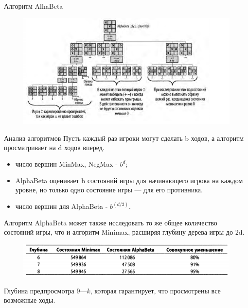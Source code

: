 \documentclass{beamer}
\begin{document}
\begin{frame}{Алгоритм AlhaBeta}
\begin{figure}[h]
\centering
\includegraphics[scale=0.6]{images/lec05-pic11.png}
\end{figure}
\end{frame}

\begin{frame}{Анализ алгоритмов}
Пусть каждый раз игроки могут сделать b ходов, а алгоритм просматривает на d ходов вперед. 
\begin{itemize}
\item число вершин MinMax, NegMax - $b^d$;
\item AlphaBeta оценивает b состояний игры для начинающего игрока на каждом уровне, но только одно состояние игры — для его противника. 
\item число вершин для AlphaBeta - $b^(d/2)$.
\end{itemize}
Алгоритм AlphaBeta может также исследовать то же общее количество состояний игры, что и алгоритм Minimax, расширяя глубину дерева игры до 2d.
\begin{figure}[h]
\centering
\includegraphics[scale=0.4]{images/lec05-pic12.png}
\end{figure}
Глубина предпросмотра $9—k$, которая гарантирует, что просмотрены все возможные ходы.
\end{frame}
\end{document}
